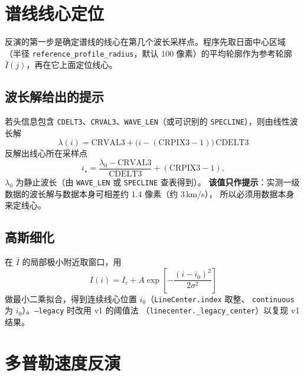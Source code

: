 \documentclass[11pt,a4paper]{ctexart}
\newcommand{\code}[1]{\texttt{\small #1}}
\begin{document}
\section{谱线线心定位}

反演的第一步是确定谱线的线心在第几个波长采样点。程序先取日面中心区域
（半径 \code{reference\_profile\_radius}，默认 100 像素）的平均轮廓作为参考轮廓
$\bar I(j)$，再在它上面定位线心。

\subsection{波长解给出的提示}
若头信息包含 \code{CDELT3}、\code{CRVAL3}、\code{WAVE\_LEN}（或可识别的
\code{SPECLINE}），则由线性波长解
\begin{equation}
  \lambda(i) = \mathrm{CRVAL3} + \bigl(i - (\mathrm{CRPIX3}-1)\bigr)\,\mathrm{CDELT3}
\end{equation}
反解出线心所在采样点
\begin{equation}
  i_\star = \frac{\lambda_0 - \mathrm{CRVAL3}}{\mathrm{CDELT3}} + (\mathrm{CRPIX3}-1),
  \label{eq:wcscenter}
\end{equation}
$\lambda_0$ 为静止波长（由 \code{WAVE\_LEN} 或 \code{SPECLINE} 查表得到）。
\textbf{该值只作提示}：实测一级数据的波长解与数据本身可相差约 1.4 像素（约 3\,km/s），
所以必须用数据本身来定线心。

\subsection{高斯细化}
在 $\bar I$ 的局部极小附近取窗口，用
\begin{equation}
  I(i) = I_c + A \exp\!\left[-\frac{(i-i_0)^2}{2\sigma^2}\right]
\end{equation}
做最小二乘拟合，得到连续线心位置 $i_0$（\code{LineCenter.index} 取整、
\code{continuous} 为 $i_0$）。\code{--legacy} 时改用 v1 的阈值法
（\code{linecenter.\_legacy\_center}）以复现 v1 结果。

\section{多普勒速度反演}
\end{document}
